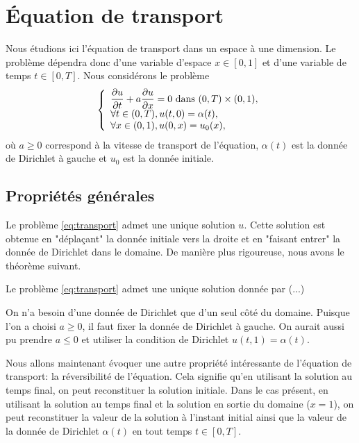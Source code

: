 \documentclass[12pt,a4paper,twoside]{article}
\begin{document}
\section{\'Equation de transport}

Nous \'etudions ici l'\'equation de transport dans un espace \`a une dimension.
Le probl\`eme d\'ependra donc d'une variable d'espace $x \in [0,1]$ et d'une variable de temps
$t \in [0,T]$.
Nous consid\'erons le probl\`eme
\begin{equation}
  \label{eq:transport}
  \left\{
    \begin{array}{l}
     \dfrac{\partial u}{\partial t} + a \dfrac{\partial u}{\partial x} = 0 
      \text{ dans } (0,T) \times (0,1),
      \\
      \forall t \in (0,T), u(t,0) = \alpha(t) ,
      \\
      \forall x \in (0,1), u(0,x) = u_0(x) ,
    \end{array}
  \right.
\end{equation}
o\`u $a \geq 0$ correspond \`a la vitesse de transport de l'\'equation,
$\alpha(t)$ est la donn\'ee de Dirichlet \`a gauche
et $u_0$ est la donn\'ee initiale.
\subsection{Propri\'et\'es g\'en\'erales}

Le probl\`eme \eqref{eq:transport} admet une unique solution $u$.
Cette solution est obtenue en "d\'epla\c{c}ant" la donn\'ee initiale
vers la droite et en "faisant entrer" la donn\'ee de Dirichlet dans le domaine.
De mani\`ere plus rigoureuse, nous avons le th\'eor\`eme suivant.

\begin{theorem}
  Le probl\`eme \eqref{eq:transport} admet une unique solution donn\'ee par
  (...)
\end{theorem}

\begin{remark}
  On n'a besoin d'une donn\'ee de Dirichlet que d'un seul c\^ot\'e du domaine.
  Puisque l'on a choisi $a \geq 0$, il faut fixer la donn\'ee de Dirichlet \`a gauche.
  On aurait aussi pu prendre $a \leq 0$ et utiliser la condition de Dirichlet
  $u(t,1) = \alpha(t)$.
\end{remark}


Nous allons maintenant \'evoquer une autre propri\'et\'e int\'eressante de l'\'equation
de transport: la r\'eversibilit\'e de l'\'equation.
Cela signifie qu'en utilisant la solution au temps final, on peut reconstituer la solution
initiale.
Dans le cas pr\'esent, en utilisant la solution au temps final et la solution en sortie 
du domaine ($x=1$), on peut reconstituer la valeur de la solution \`a l'instant initial
ainsi que la valeur de la donn\'ee de Dirichlet $\alpha(t)$ en tout temps $t \in [0,T]$.
\end{document}
